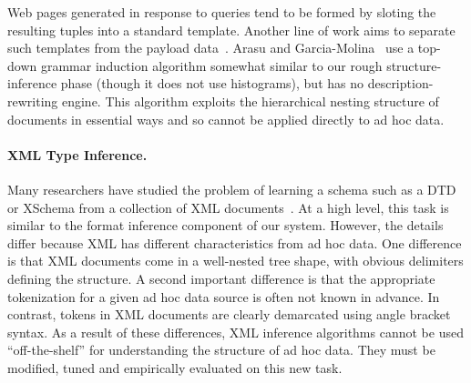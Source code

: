 Web pages generated in response to queries tend to be formed by
sloting the resulting tuples into a standard template.  Another line
of work aims to separate such templates from the payload
data~\cite{arasu+:sigmod03,Cresenzi+:roadrunner}.  
Arasu and Garcia-Molina~\cite{arasu+:sigmod03}
use a top-down grammar induction
algorithm somewhat similar to our rough structure-inference phase
(though it does not use histograms),
but has no description-rewriting engine.  
This algorithm exploits the hierarchical nesting
structure of \xml{} documents in essential ways
and so cannot be applied directly to ad hoc data.  








\paragraph*{XML Type Inference.}
Many researchers have studied the problem of learning
a schema such as a DTD or XSchema from a collection 
of XML
documents~\cite{bex+:dtd-inference,bex+:inferring-xml-schema,fernau:learning-xml,garofalakis+:xtract}.  
At a high level, this task is similar to the format inference component of our system.  
However, the details differ because XML has different characteristics
from ad hoc data.  One difference is that XML documents come in a well-nested tree 
shape, with obvious delimiters defining the structure.  
A second important difference is that the appropriate tokenization for
a given ad hoc data source is often not known in advance.  
In contrast,
tokens in XML documents are clearly demarcated using angle bracket syntax.
As a result of these differences,
XML inference algorithms cannot be used ``off-the-shelf'' for understanding
the structure of ad hoc data.  They must be modified, tuned and
empirically evaluated on this new task.

